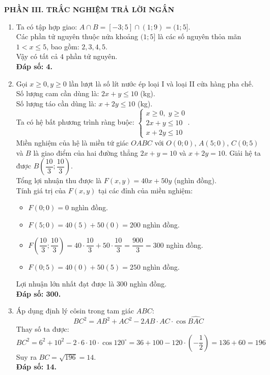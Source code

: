 \documentclass[12pt,a4paper]{article}
\begin{document}
\textbf{PHẦN III. TRẮC NGHIỆM TRẢ LỜI NGẮN}

\begin{enumerate}[resume]
\item Ta có tập hợp giao: $A \cap B = [-3; 5] \cap (1; 9) = (1; 5]$.\\
Các phần tử nguyên thuộc nửa khoảng $(1; 5]$ là các số nguyên thỏa mãn $1 < x \le 5$, bao gồm: $2, 3, 4, 5$.\\
Vậy có tất cả $4$ phần tử nguyên.\\
\textbf{Đáp số: 4.}

\item Gọi $x \ge 0, y \ge 0$ lần lượt là số lít nước ép loại I và loại II cửa hàng pha chế.\\
Số lượng cam cần dùng là: $2x + y \le 10$ (kg).\\
Số lượng táo cần dùng là: $x + 2y \le 10$ (kg).\\
Ta có hệ bất phương trình ràng buộc:
$\begin{cases} x \ge 0,\; y \ge 0 \\ 2x + y \le 10 \\ x + 2y \le 10 \end{cases}$.\\
Miền nghiệm của hệ là miền tứ giác $OABC$ với $O(0; 0)$, $A(5; 0)$, $C(0; 5)$ và $B$ là giao điểm của hai đường thẳng $2x + y = 10$ và $x + 2y = 10$. Giải hệ ta được $B\left(\dfrac{10}{3}; \dfrac{10}{3}\right)$.\\
Tổng lợi nhuận thu được là $F(x, y) = 40x + 50y$ (nghìn đồng).\\
Tính giá trị của $F(x, y)$ tại các đỉnh của miền nghiệm:
\begin{itemize}
    \item $F(0; 0) = 0$ nghìn đồng.
    \item $F(5; 0) = 40(5) + 50(0) = 200$ nghìn đồng.
    \item $F\left(\dfrac{10}{3}; \dfrac{10}{3}\right) = 40 \cdot \dfrac{10}{3} + 50 \cdot \dfrac{10}{3} = \dfrac{900}{3} = 300$ nghìn đồng.
    \item $F(0; 5) = 40(0) + 50(5) = 250$ nghìn đồng.
\end{itemize}
Lợi nhuận lớn nhất đạt được là $300$ nghìn đồng.\\
\textbf{Đáp số: 300.}

\item Áp dụng định lý côsin trong tam giác $ABC$:
\[ BC^2 = AB^2 + AC^2 - 2AB \cdot AC \cdot \cos \widehat{BAC} \]
Thay số ta được:
\[ BC^2 = 6^2 + 10^2 - 2 \cdot 6 \cdot 10 \cdot \cos 120^\circ = 36 + 100 - 120 \cdot \left(-\dfrac{1}{2}\right) = 136 + 60 = 196 \]
Suy ra $BC = \sqrt{196} = 14$.\\
\textbf{Đáp số: 14.}


\end{enumerate}
\end{document}

